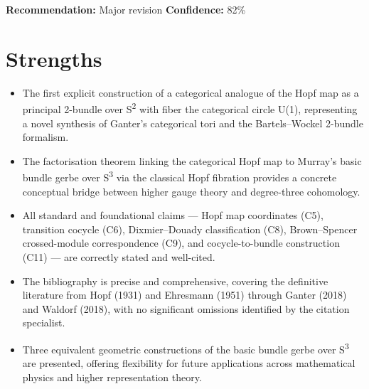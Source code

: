 \documentclass[11pt]{article}
\begin{document}
\textbf{Recommendation:} Major revision \quad \textbf{Confidence:} 82\%\\

\section*{Strengths}
\begin{itemize}[leftmargin=*]
  \item The first explicit construction of a categorical analogue of the Hopf map as a principal 2-bundle over S\textsuperscript{2} with fiber the categorical circle U(1), representing a novel synthesis of Ganter's categorical tori and the Bartels--Wockel 2-bundle formalism.
  \item The factorisation theorem linking the categorical Hopf map to Murray's basic bundle gerbe over S\textsuperscript{3} via the classical Hopf fibration provides a concrete conceptual bridge between higher gauge theory and degree-three cohomology.
  \item All standard and foundational claims --- Hopf map coordinates (C5), transition cocycle (C6), Dixmier--Douady classification (C8), Brown--Spencer crossed-module correspondence (C9), and cocycle-to-bundle construction (C11) --- are correctly stated and well-cited.
  \item The bibliography is precise and comprehensive, covering the definitive literature from Hopf (1931) and Ehresmann (1951) through Ganter (2018) and Waldorf (2018), with no significant omissions identified by the citation specialist.
  \item Three equivalent geometric constructions of the basic bundle gerbe over S\textsuperscript{3} are presented, offering flexibility for future applications across mathematical physics and higher representation theory.
\end{itemize}
\end{document}
